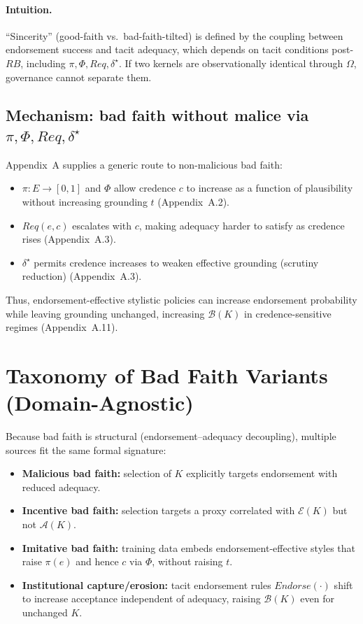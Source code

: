 \documentclass[preprints,article,submit,pdftex,moreauthors,accept]{Definitions/mdpi}
\begin{document}
\paragraph{Intuition.}
``Sincerity'' (good-faith vs.\ bad-faith-tilted) is defined by the coupling between endorsement success and tacit adequacy, which depends on tacit conditions post-\(RB\), including \(\pi,\Phi,Req,\delta^\star\). If two kernels are observationally identical through \(\Omega\), governance cannot separate them.

\subsection{Mechanism: bad faith without malice via \texorpdfstring{\(\pi,\Phi,Req,\delta^\star\)}{pi, Phi, Req, delta*}}
Appendix~A supplies a generic route to non-malicious bad faith:
\begin{itemize}
  \item \(\pi:E\to[0,1]\) and \(\Phi\) allow credence \(c\) to increase as a function of plausibility without increasing grounding \(t\) (Appendix~A.2).
  \item \(Req(e,c)\) escalates with \(c\), making adequacy harder to satisfy as credence rises (Appendix~A.3).
  \item \(\delta^\star\) permits credence increases to weaken effective grounding (scrutiny reduction) (Appendix~A.3).
\end{itemize}
Thus, endorsement-effective stylistic policies can increase endorsement probability while leaving grounding unchanged, increasing \(\mathcal{B}(K)\) in credence-sensitive regimes (Appendix~A.11).

\section{Taxonomy of Bad Faith Variants (Domain-Agnostic)}
Because bad faith is structural (endorsement--adequacy decoupling), multiple sources fit the same formal signature:
\begin{itemize}
  \item \textbf{Malicious bad faith:} selection of \(K\) explicitly targets endorsement with reduced adequacy.
  \item \textbf{Incentive bad faith:} selection targets a proxy correlated with \(\mathcal{E}(K)\) but not \(\mathcal{A}(K)\).
  \item \textbf{Imitative bad faith:} training data embeds endorsement-effective styles that raise \(\pi(e)\) and hence \(c\) via \(\Phi\), without raising \(t\).
  \item \textbf{Institutional capture/erosion:} tacit endorsement rules \(Endorse(\cdot)\) shift to increase acceptance independent of adequacy, raising \(\mathcal{B}(K)\) even for unchanged \(K\).
\end{itemize}
\end{document}
